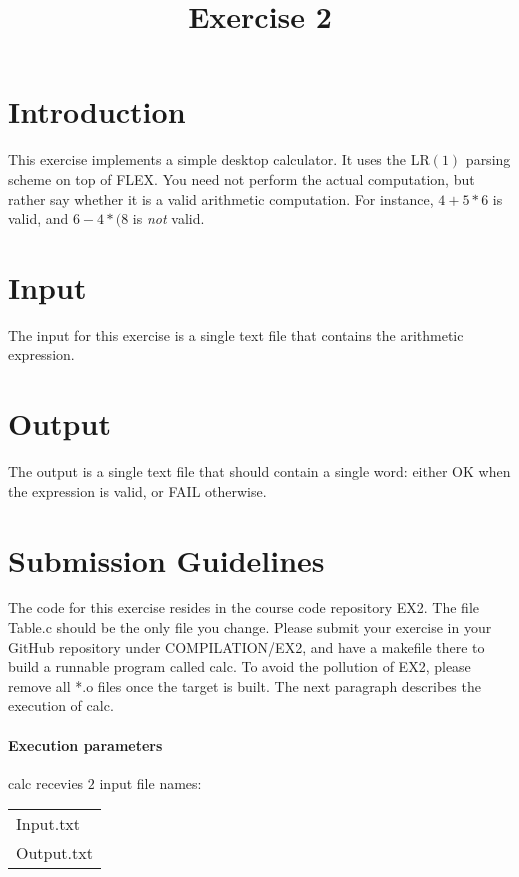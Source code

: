 \documentclass{article}
\begin{document}
\title{Exercise 2}
\maketitle

\section{Introduction}
This exercise implements a simple desktop calculator.
It uses the LR$(1)$ parsing scheme on top of FLEX.
You need not perform the actual computation, but rather say
whether it is a valid arithmetic computation.
For instance, $4+5*6$ is valid, and $6-4*(8$
is \textit{not} valid.

\section{Input}
The input for this exercise is a single text file that contains the arithmetic expression.

\section{Output}
The output is a single text file that should contain a single word:
either OK when the expression is valid, or FAIL otherwise. 

\section{Submission Guidelines}
The code for this exercise resides in the course code repository EX2.
The file Table.c should be the only file you change.
Please submit your exercise in your GitHub repository under
COMPILATION/EX2, and have a makefile there to build a runnable program called calc.
To avoid the pollution of EX2, please remove all *.o files once the target is built.
The next paragraph describes the execution of calc.

\paragraph{Execution parameters}
calc recevies $2$ input file names:
\begin{table}[h]
\centering
\begin{tabular}{ l }
  Input.txt  \\
  Output.txt \\
\end{tabular}
\end{table}
\end{document}
